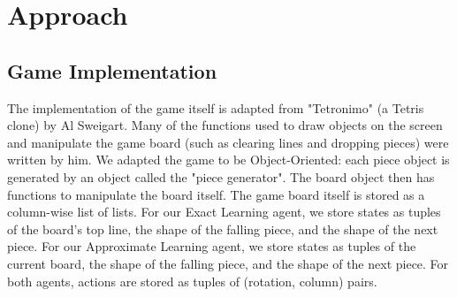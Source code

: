 \documentclass[10pt]{article}
\begin{document}
\section{Approach}

\subsection{Game Implementation}
The implementation of the game itself is adapted from "Tetronimo" (a Tetris clone) by Al Sweigart. Many of the functions used to draw objects on the screen and manipulate the game board (such as clearing lines and dropping pieces) were written by him\cite{WEBSITE:1}. We adapted the game to be Object-Oriented: each piece object is generated by an object called the "piece generator". The board object then has functions to manipulate the board itself. The game board itself is stored as a column-wise list of lists. For our Exact Learning agent, we store states as tuples of the board's top line, the shape of the falling piece, and the shape of the next piece. For our Approximate Learning agent, we store states as tuples of the current board, the shape of the falling piece, and the shape of the next piece. For both agents, actions are stored as tuples of (rotation, column) pairs.
\end{document}
